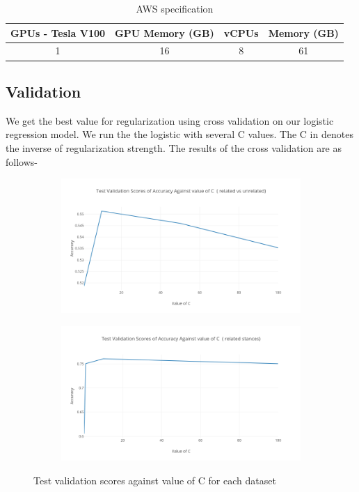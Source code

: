 \documentclass[11.5pt]{article}
\begin{document}
\begin{table}[h]
  \centering
  \begin{tabular} 
    {|c|c|c|c|}
    \hline
    GPUs - Tesla V100 & GPU Memory (GB) & vCPUs & Memory (GB) \\
    \hline
    1 & 16 & 8 & 61 \\
    \hline
  \end{tabular}
  \caption{AWS specification}
\end{table}

\subsection{Validation}

We get the best value for regularization using cross validation on our logistic regression model. We run the the logistic with several C values. The C in denotes the inverse of regularization strength. The results of the cross validation are as follows-

\begin{figure}[h!]
  \begin{subfigure}{.5\textwidth}
    \centering
    \includegraphics[width=.9\linewidth]{plot_1}
  \end{subfigure}
  \begin{subfigure}{.5\textwidth}
    \centering
    \includegraphics[width=.9\linewidth]{plot_2}
  \end{subfigure}
  \caption{Test validation scores against value of C for each dataset}
  \label{fig:logistic}
\end{figure}
\end{document}
